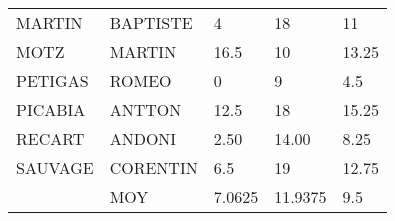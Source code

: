 \begin{table}[]
{\begin{tabular}{|l|l|l|l|l|}
MARTIN              & BAPTISTE & 4      & 18      & 11      \\
MOTZ                & MARTIN   & 16.5   & 10      & 13.25   \\
PETIGAS             & ROMEO    & 0      & 9       & 4.5     \\
PICABIA             & ANTTON   & 12.5   & 18      & 15.25   \\
RECART              & ANDONI   & 2.50   & 14.00   & 8.25    \\
SAUVAGE             & CORENTIN & 6.5    & 19      & 12.75   \\ \hline
                    & MOY      & 7.0625 & 11.9375 & 9.5     \\ \hline
\end{tabular}
}
\end{table}

